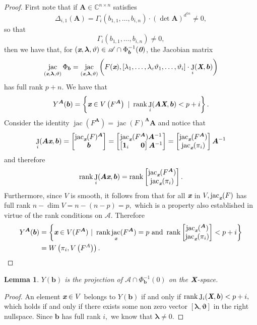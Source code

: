 \documentclass[a4paper]{article}
\def\sA{\mathscr{A}}
\def\bz{\textit{\textbf{0}}}
\def\Xb{\textit{\textbf{X}}}
\def\mA{{\bm A}}
\def\xb{\textit{\textbf{x}}}
\def\vt{\vartheta}
\DeclareMathOperator{\J}{J}
\DeclareMathOperator{\jac}{jac}
\DeclareMathOperator{\rk}{rank}
\def\C{\mathbb{C}}
\def\bbm{\begin{bmatrix}}
\def\ebm{\end{bmatrix}}
\def\gi{\Gamma_i}
\newtheorem{lemma}[theorem]{Lemma}
\begin{document}
    \begin{proof}
    First note that if $\bm A \in \C^{n \times n}$ satisfies
    \[
    \Delta_{i,1}(\bm A) = \Gamma_i(b_{1,1},\hdots,b_{i,n})\cdot (\det \bm A)^{d^{5n}}\not = 0, 
    \]
    so that
    \[        
    \gi(b_{1,1},\hdots,b_{i,n}) \not = 0,
    \]
    then we have that, for $(\xb, \bm \lambda, \vt) \in \sA \cap \Phi^{-1}_{\bm b}(\bz)$, the Jacobian matrix 
    \[
    \jac_{(\xb, \bm \lambda, \vt)}\Phi_{\bm b} 
    = \jac_{(\xb, \bm \lambda, \vt)}\left(F(\xb),[\lambda_1, \hdots, \lambda_c \vt_1, \hdots, \vt_i ] \cdot 
   \J_i(\Xb,\bm b)
    \right)
    \]
    has full rank $p + n$. We have that
    \[
    Y^{\mA}(\bm b) = \left\{\xb \in V\left(F^{\mA}\right)~
    |~\rk     
\J_i(\mA \Xb,\bm b)
     < p+i\right\}.
    \]
    Consider the identity $\jac(F^{\mA}) = \jac(F)^{\mA}\mA$ and notice that
    \[
    \J_i(\mA\xb,\bm b)
    =
    \bbm 
    \jac_{\xb}(F)^\mA\\
    \bm b
     \ebm
     =
    \bbm 
    \jac_{\xb}(F^\mA)\mA^{-1}\\
    \bbm
    \bm 1_i ~~~~~ \bm 0
    \ebm\mA^{-1} 
     \ebm
     =
     \bbm 
    \jac_{\xb}(F^\mA)\\
    \jac_{\xb}(\pi_i)
     \ebm
    \mA^{-1}
    \]
    and therefore 
    \[
    \rk \J_i(\mA\xb,\bm b)
    =
    \rk
     \bbm 
    \jac_{\xb}(F^\mA)\\
    \jac_{\xb}(\pi_i)
     \ebm.
    \]
    Furthermore, since $V$ is smooth, it follows from \cite[Corollary 16.20]{ECA} that for all $\xb$ in $V, \jac_{\xb}(F)$ has full rank $n - \dim V = n -(n-p) = p ,$ which is a property also established in virtue of the rank conditions on $\sA.$
    Therefore 
    \begin{align*}
     Y^{\mA}(\bm b) &= \left\{\xb \in V(F^{\mA})~
    |~\rk \jac_{\xb}(F^{\mA})=p
    \textrm{ and }
    \rk     
    \bbm 
    \jac_{\xb}(^{\mA})\\
    \jac_{\xb}(\pi_i)
     \ebm
     < p+i\right\} \\
     &= W\left(\pi_i,V\left(F^A\right)\right). 
    \end{align*}
    \end{proof}
    \begin{lemma}
    $Y(\bm b)$ is the projection of $\sA \cap \Phi^{-1}_{\bm b}(0)$ on the $\Xb$-space.
    \end{lemma}
    \begin{proof}
    An element $\xb \in V$ belongs to $Y(\bm b)$ if and only if $\rk     
    \J_i(\Xb,\bm b)
    < p + i,$
    which holds if and only if there exists some non zero vector $[\bm \lambda, \bm \vt]$ in the right nullspace. Since $\bm b$ has full rank $i,$ we know that $\bm \lambda \not = 0$.
    \end{proof}
\end{document}
